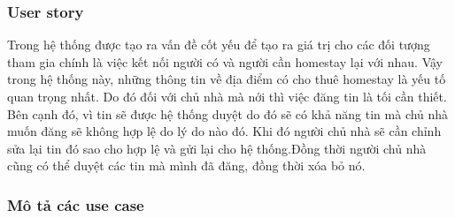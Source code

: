 \subsubsection{User story}
Trong hệ thống được tạo ra vấn đề cốt yếu để tạo ra giá trị cho các đối tượng tham gia chính là việc kết nối người có và người cần homestay lại với nhau. Vậy trong hệ thống này, những thông tin về địa điểm có cho thuê homestay là yếu tố quan trọng nhất. Do đó đối với chủ nhà mà nới thì việc đăng tin là tối cần thiết. Bên cạnh đó, vì tin sẽ được hệ thống duyệt do đó sẽ có khả năng tin mà chủ nhà muốn đăng sẽ không hợp lệ do lý do nào đó. Khi đó người chủ nhà sẽ cần chỉnh sửa lại tin đó sao cho hợp lệ và gửi lại cho hệ thống.Đồng thời người chủ nhà cũng có thể duyệt các tin mà mình đã đăng, đồng thời xóa bỏ nó.

\subsubsection{Mô tả các use case}


